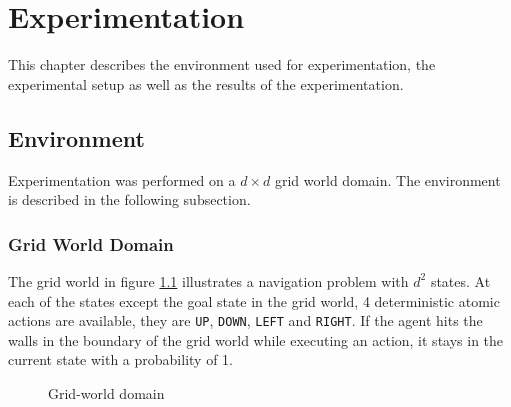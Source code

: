 
\chapter{Experimentation}

This chapter describes the environment used for experimentation, the experimental setup as well as the results of the experimentation.

\section{Environment}

Experimentation was performed on a $d \times d$ grid world domain. The environment is described in the following subsection.

\subsection*{Grid World Domain}

The grid world in figure \ref{fig:grid_domain} illustrates a navigation problem with $d^2$ states.
At each of the states except the goal state in the grid world, 4 deterministic atomic actions are available, they are \texttt{UP}, \texttt{DOWN}, \texttt{LEFT} and \texttt{RIGHT}.
If the agent hits the walls in the boundary of the grid world while executing an action, it stays in the current state with a probability of 1.

\begin{figure}[!htbp]
    \centering
    
    \caption{Grid-world domain}
    \label{fig:grid_domain}
\end{figure}

